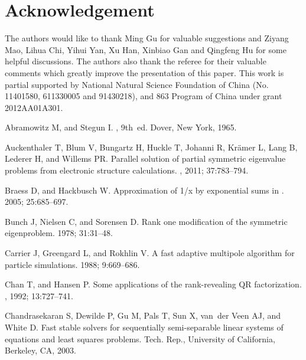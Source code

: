 \documentclass[times]{nlaauth}
\newcounter{algorithm}
\begin{document}
\section*{Acknowledgement}

The authors would like to thank Ming Gu for valuable suggestions and Ziyang Mao,
Lihua Chi, Yihui Yan, Xu Han, Xinbiao Gan
and Qingfeng Hu for some helpful discussions.
The authors also thank the referee for their valuable comments which greatly improve the presentation of this paper.
This work is partial supported by National Natural Science Foundation of China (No. 11401580, 611330005 and 91430218),
and 863 Program of China under grant 2012AA01A301.



\begin{thebibliography}{99}

{ Abramowitz M, and Stegun I.}
, 9th~ed.
\newblock Dover, New York, 1965.

{  Auckenthaler T, Blum V, Bungartz H, Huckle T, Johanni R,
  Kr\"{a}mer L, Lang B, Lederer H, and Willems PR.}
\newblock Parallel solution of partial symmetric eigenvalue problems from
  electronic structure calculations.
, 2011; 37:783--794.



{  Braess D, and Hackbusch W.}
\newblock Approximation of 1/x by exponential sums in .
 2005; 25:685--697.

{  Bunch J, Nielsen C, and Sorensen D.}
\newblock Rank one modification of the symmetric eigenproblem.
 1978; 31:31--48.

{  Carrier J, Greengard L, and Rokhlin V.}
\newblock A fast adaptive multipole algorithm for particle simulations.
 1988; 9:669--686.

{  Chan T, and Hansen P.}
\newblock Some applications of the rank-revealing {QR} factorization.
, 1992; 13:727--741.

{  Chandrasekaran S, Dewilde P, Gu M, Pals T, Sun X, van~der Veen
  AJ, and White D.}
\newblock Fast stable solvers for sequentially semi-separable linear systems of
  equations and least squares problems.
\newblock Tech. Rep., University of California, Berkeley, CA, 2003.


\end{thebibliography}
\end{document}
